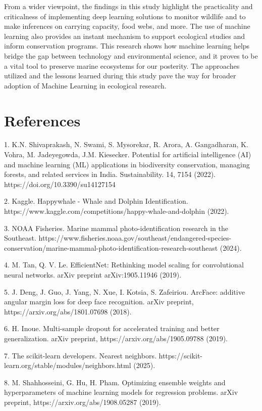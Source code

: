 \documentclass[twocolumn]{article}
\begin{document}
From a wider viewpoint, the findings in this study highlight the practicality and criticalness of implementing deep learning solutions to monitor wildlife and to make inferences on carrying capacity, food webs, and more. The use of machine learning also provides an instant mechanism to support ecological studies and inform conservation programs. This research shows how machine learning helps bridge the gap between technology and environmental science, and it proves to be a vital tool to preserve marine ecosystems for our posterity. The approaches utilized and the lessons learned during this study pave the way for broader adoption of Machine Learning in ecological research. 

\section{References}
1. K.N. Shivaprakash, N. Swami, S. Mysorekar, R. Arora, A. Gangadharan, K. Vohra, M. Jadeyegowda, J.M. Kiesecker. Potential for artificial intelligence (AI) and machine learning (ML) applications in biodiversity conservation, managing forests, and related services in India. Sustainability. 14, 7154 (2022). https://doi.org/10.3390/su14127154

2. Kaggle. Happywhale - Whale and Dolphin Identification. https://www.kaggle.com/competitions/happy-whale-and-dolphin (2022).

3. NOAA Fisheries. Marine mammal photo-identification research in the Southeast. https://www.fisheries.noaa.gov/southeast/endangered-species-conservation/marine-mammal-photo-identification-research-southeast (2024).

4. M. Tan, Q. V. Le. EfficientNet: Rethinking model scaling for convolutional neural networks. arXiv preprint arXiv:1905.11946 (2019).

5. J. Deng, J. Guo, J. Yang, N. Xue, I. Kotsia, S. Zafeiriou. ArcFace: additive angular margin loss for deep face recognition. arXiv preprint, https://arxiv.org/abs/1801.07698 (2018).

6. H. Inoue. Multi-sample dropout for accelerated training and better generalization. arXiv preprint, https://arxiv.org/abs/1905.09788 (2019).

7. The scikit-learn developers. Nearest neighbors. https://scikit-learn.org/stable/modules/neighbors.html (2025).

8. M. Shahhosseini, G. Hu, H. Pham. Optimizing ensemble weights and hyperparameters of machine learning models for regression problems. arXiv preprint, https://arxiv.org/abs/1908.05287 (2019).
\end{document}
